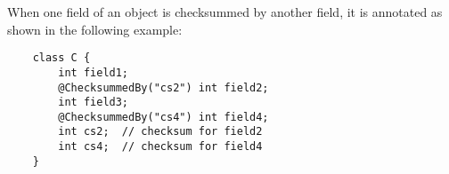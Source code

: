 When one field of an object is checksummed by another field, it is annotated as shown in the following example:

\begin{Verbatim}
    class C {
        int field1;
        @ChecksummedBy("cs2") int field2;
        int field3;
        @ChecksummedBy("cs4") int field4;
        int cs2;  // checksum for field2
        int cs4;  // checksum for field4
    }
\end{Verbatim}

